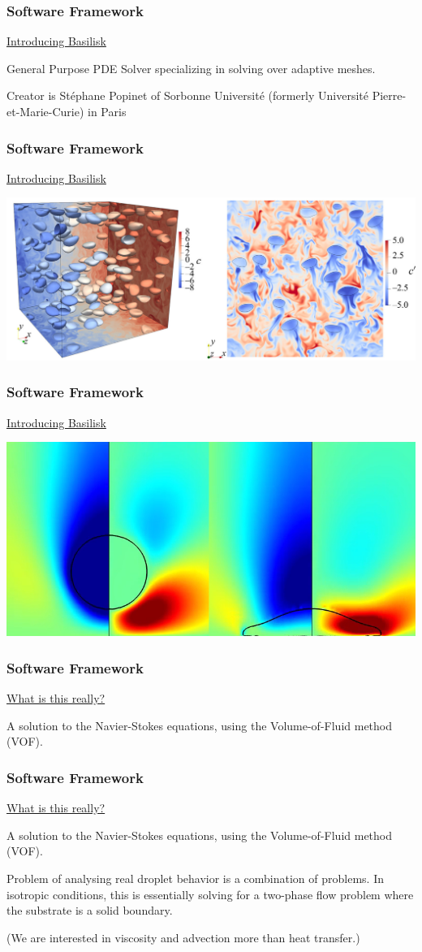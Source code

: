 \documentclass[12pt]{beamer}
\begin{document}
\begin{frame}
    \frametitle{Software Framework}
    \underline{Introducing Basilisk}

    General Purpose PDE Solver specializing in solving over adaptive meshes.

    Creator is Stéphane Popinet of Sorbonne Université (formerly Université Pierre-et-Marie-Curie) in Paris
\end{frame}
\begin{frame}
    \frametitle{Software Framework}
    \underline{Introducing Basilisk}

    \includegraphics[width=\textwidth]{img/3-hidman2023.jpg}
\end{frame}
\begin{frame}
    \frametitle{Software Framework}
    \underline{Introducing Basilisk}

    \includegraphics[width=\textwidth]{img/4-drop.png}
\end{frame}
\begin{frame}
    \frametitle{Software Framework}
    \underline{What is this really?}

    A solution to the Navier-Stokes equations,
    using the Volume-of-Fluid method (VOF).
\end{frame}
\begin{frame}
    \frametitle{Software Framework}
    \underline{What is this really?}

    A solution to the Navier-Stokes equations,
    using the Volume-of-Fluid method (VOF).

    Problem of analysing real droplet behavior is a combination of problems. In 
    isotropic conditions, this is essentially solving for a two-phase flow 
    problem where the substrate is a solid boundary.

    (We are interested in viscosity and advection more than heat transfer.)
\end{frame}
\end{document}
